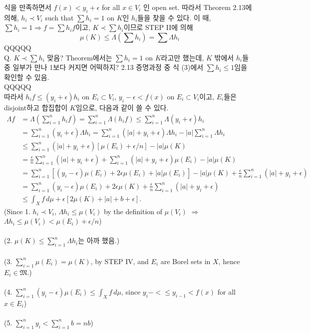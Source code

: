 \documentclass[11pt,reqno]{amsart}
\renewcommand{\(}{\left(}
\renewcommand{\)}{\right)}
\renewcommand{\[}{\left[}
\renewcommand{\]}{\right]}
\newcommand{\ep}{\epsilon}
\newcommand{\M}{\mathfrak{M}}
\begin{document}
식을 만족하면서 $f(x) < y_i + \ep$ for all $x \in V_i$ 인 open set. 따라서 Theorem 2.13에 의해, $h_i \prec V_i$
such that $\sum h_i = 1$ on $K$인 $h_i$들을 찾을 수 있다. 이 때, $\sum h_i = 1 \Rightarrow f = \sum h_i f$이고,
$K \prec \sum h_i$이므로 STEP II에 의해 \begin{equation*}
  \mu(K) \le \Lambda (\sum h_i) = \sum \Lambda h_i
\end{equation*}
QQQQQ \\
 Q. $K \prec \sum h_i$ 맞음? Theorem에서는 $\sum h_i = 1$ on $K$라고만 했는데, $K$ 밖에서 $h_i$들 중 일부가 만나 
 1보다 커지면 어떡하지? 2.13 증명과정 중 식 (3)에서 $\sum h_i \le 1$임을 확인할 수 있음. \\
QQQQQ \\
따라서 $h_i f \le (y_i + \ep) h_i$ on $E_i \subset V_i$, $y_i - \ep < f(x)$ on $E_i \subset V_i$이고, 
$E_i$들은 disjoint하고 합집합이 $K$임으로, 다음과 같이 쓸 수 있다.
\begin{align*}
  \Lambda f &= \Lambda(\sum_{i=1}^{n} h_i f) = \sum_{i=1}^{n} \Lambda(h_i f) \le \sum_{i=1}^{n} \Lambda (y_i + \epsilon)h_i \\
  &= \sum_{i=1}^{n} (y_i + \epsilon)\Lambda h_i = \sum_{i=1}^{n} (|a| + y_i + \epsilon)\Lambda h_i - |a| \sum_{i=1}^{n} \Lambda h_i \\
  &\le \sum_{i=1}^{n} (|a| + y_i + \epsilon)[\mu(E_i) + \epsilon/n] - |a| \mu(K) \\
  &= \frac{\ep}{n} \sum_{i=1}^{n} (|a| + y_i + \epsilon) + \sum_{i=1}^{n} (|a| + y_i + \epsilon)\mu(E_i) - |a| \mu(K) \\
  &= \sum_{i=1}^{n} \[ (y_i - \epsilon)\mu(E_i) + 2 \ep \mu(E_i) + |a| \mu (E_i) \] - |a| \mu(K) + \frac{\ep}{n} \sum_{i=1}^{n} (|a| + y_i + \epsilon)\\
  &= \sum_{i=1}^{n} (y_i - \epsilon)\mu(E_i) + 2\epsilon \mu(K) + \frac{\epsilon}{n} \sum_{i=1}^{n} (|a| + y_i + \epsilon) \\
  &\le \int_X f \, d\mu + \epsilon[2\mu(K) + |a| + b + \epsilon].
\end{align*}
(Since 1. $h_i \prec V_i$, $\Lambda h_i \le \mu(V_i)$ by the definition of $\mu (V_i)$ $\Rightarrow$ 
$\Lambda h_i \le \mu(V_i) < \mu (E_i) + \ep/n$) \\ \\
(2. $\mu(K) \le \sum_{i=1}^{n} \Lambda h_i$는 아까 했음.) \\ \\
(3. $\sum_{i=1}^{n} \mu(E_i)  = \mu(K)$, by STEP IV, and $E_i$ are Borel sets in $X$, hence $E_i \in \M$.) \\ \\
(4. $\sum_{i=1}^{n} (y_i - \epsilon)\mu(E_i) \le \int_X f \, d\mu$, since $y_i - < \le y_{i-1} < f(x)$ for all $x \in E_i$) \\ \\
(5. $\sum_{i=1}^{n} y_i < \sum_{i=1}^{n} b = nb$)
\end{document}
